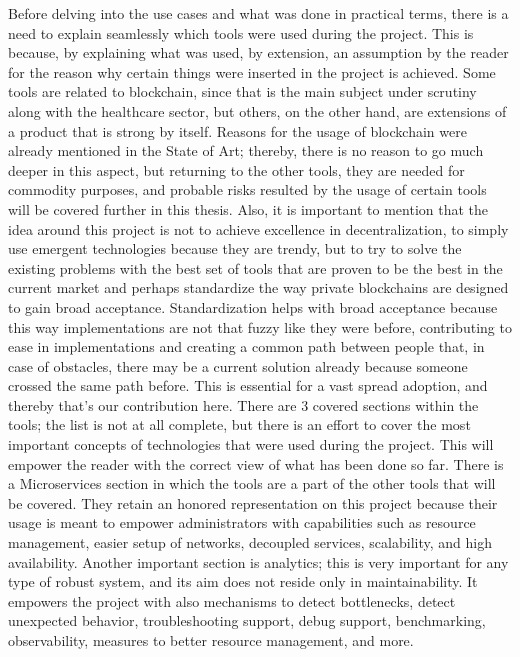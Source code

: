 Before delving into the use cases and what was done in practical terms, there is a need to explain seamlessly which tools were used during the project. This is because, by explaining what was used, by extension, an assumption by the reader for the reason why certain things were inserted in the project is achieved. Some tools are related to blockchain, since that is the main subject under scrutiny along with the healthcare sector, but others, on the other hand, are extensions of a product that is strong by itself. Reasons for the usage of blockchain were already mentioned in the State of Art; thereby, there is no reason to go much deeper in this aspect, but returning to the other tools, they are needed for commodity purposes, and probable risks resulted by the usage of certain tools will be covered further in this thesis. Also, it is important to mention that the idea around this project is not to achieve excellence in decentralization, to simply use emergent technologies because they are trendy, but to try to solve the existing problems with the best set of tools that are proven to be the best in the current market and perhaps standardize the way private blockchains are designed to gain broad acceptance. Standardization helps with broad acceptance because this way implementations are not that fuzzy like they were before, contributing to ease in implementations and creating a common path between people that, in case of obstacles, there may be a current solution already because someone crossed the same path before. This is essential for a vast spread adoption, and thereby that's our contribution here.
There are 3 covered sections within the tools; the list is not at all complete, but there is an effort to cover the most important concepts of technologies that were used during the project. This will empower the reader with the correct view of what has been done so far.
There is a Microservices section in which the tools are a part of the other tools that will be covered. They retain an honored representation on this project because their usage is meant to empower administrators with capabilities such as resource management, easier setup of networks, decoupled services, scalability, and high availability.
Another important section is analytics; this is very important for any type of robust system, and its aim does not reside only in maintainability. It empowers the project with also mechanisms to detect bottlenecks, detect unexpected behavior, troubleshooting support, debug support, benchmarking, observability, measures to better resource management, and more.

